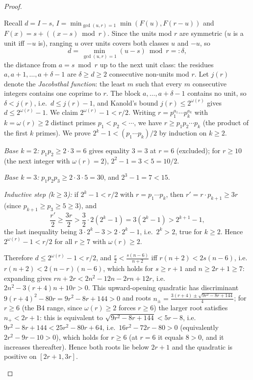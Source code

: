 \documentclass[11pt]{article}
\theoremstyle{definition}
\begin{document}
\begin{proof}
\begin{itemize}
  Recall $d=I-s$, $I=\min_{\gcd(u,r)=1}\min(F(u),F(r-u))$ and
  $F(x)=s+((x-s)\bmod r)$. Since the units mod $r$ are symmetric
  ($u$ is a unit iff $-u$ is), ranging $u$ over units covers both
  classes $u$ and $-u$, so
  \[
  d=\min_{\gcd(u,r)=1}(u-s)\bmod r=:\delta,
  \]
  the distance from $a=s\bmod r$ up to the next unit class: the
  residues $a,a+1,\ldots,a+\delta-1$ are $\delta\ge d\ge2$ consecutive
  non-units mod $r$. Let $j(r)$ denote the \emph{Jacobsthal function}:
  the least $m$ such that every $m$ consecutive integers contains one
  coprime to $r$. The block $a,\ldots,a+\delta-1$ contains no unit, so
  $\delta<j(r)$, i.e.\ $d\le j(r)-1$, and Kanold's bound
  $j(r)\le2^{\omega(r)}$ \cite{Kanold1967} gives $d\le2^{\omega(r)}-1$.
  We claim $2^{\omega(r)}-1<r/2$. Writing $r=p_1^{a_1}\cdots p_k^{a_k}$
  with $k=\omega(r)\ge2$ distinct primes $p_1<p_2<\cdots$, we have
  $r\ge p_1p_2\cdots p_k$ (the product of the first $k$ primes). We prove
  $2^k-1<(p_1\cdots p_k)/2$ by induction on $k\ge2$.

  \emph{Base $k=2$:} $p_1p_2\ge2\cdot3=6$ gives equality $3=3$ at $r=6$
  (excluded); for $r\ge10$ (the next integer with $\omega(r)=2$),
  $2^2-1=3<5=10/2$.

  \emph{Base $k=3$:} $p_1p_2p_3\ge2\cdot3\cdot5=30$, and $2^3-1=7<15$.

  \emph{Inductive step ($k\ge3$):} if $2^k-1<r/2$ with
  $r=p_1\cdots p_k$, then $r'=r\cdot p_{k+1}\ge3r$ (since
  $p_{k+1}\ge p_3\ge5\ge3$), and
  \[
  \frac{r'}{2}\ge\frac{3r}{2}>\frac{3}{2}\cdot2(2^k-1)=3(2^k-1)
  >2^{k+1}-1,
  \]
  the last inequality being $3\cdot2^k-3>2\cdot2^k-1$, i.e.\ $2^k>2$,
  true for $k\ge2$. Hence $2^{\omega(r)}-1<r/2$ for all $r\ge7$ with
  $\omega(r)\ge2$.

  Therefore $d\le2^{\omega(r)}-1<r/2$, and
  $\frac{r}{2}<\frac{s(n-6)}{n+2}$ iff $r(n+2)<2s(n-6)$, i.e.\
  $r(n+2)<2(n-r)(n-6)$, which holds for $s\ge r+1$ and $n\ge2r+1\ge7$:
  expanding gives $r n+2r<2n^2-12n-2rn+12r$, i.e.\ $2n^2-3(r+4)n+10r>0$.
  This upward-opening quadratic has discriminant $9(r+4)^2-80r=9r^2-8r+144>0$
  and roots $n_\pm=\frac{3(r+4)\pm\sqrt{9r^2-8r+144}}{4}$; for $r\ge6$
  (the B4 range, since $\omega(r)\ge2$ forces $r\ge6$) the larger root
  satisfies $n_+<2r+1$: this is equivalent to
  $\sqrt{9r^2-8r+144}<5r-8$, i.e.\ $9r^2-8r+144<25r^2-80r+64$, i.e.\
  $16r^2-72r-80>0$ (equivalently $2r^2-9r-10>0$), which holds for
  $r\ge6$ (at $r=6$ it equals $8>0$, and it increases thereafter). Hence
  both roots lie below $2r+1$ and the quadratic is positive on $[2r+1,3r]$.


\end{itemize}
\end{proof}
\end{document}
